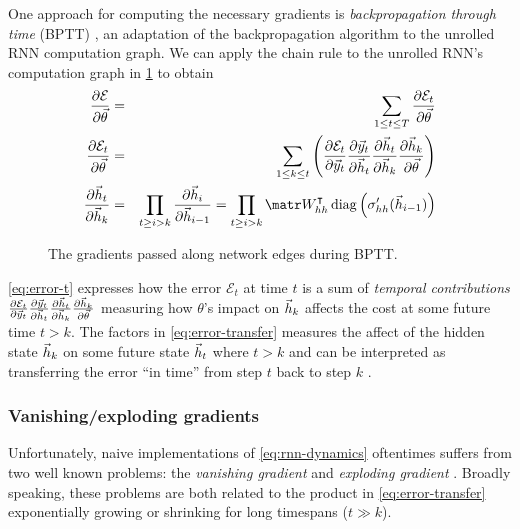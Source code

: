 One approach for computing the necessary gradients is \emph{backpropagation
through time} (BPTT) \citep{goller1996learning}, an adaptation of the backpropagation
algorithm \citep{linnainmaa1970representation,rumelhart1988learning} to the unrolled RNN computation
graph. We can apply the chain rule to the unrolled RNN's computation graph in
\cref{fig:rnn-bptt} to obtain
\begin{align}
    \frac{\pd \mathcal{E}}{\pd \vec{\theta}} &=& \sum_{1 \leq t \leq T} \frac{\pd \mathcal{E}_t}{\pd \vec{\theta}} \\
    \frac{\pd \mathcal{E}_t}{\pd \vec{\theta}} &=& \sum_{1 \leq k \leq t} \left(
        \frac{\pd \mathcal{E}_t}{\pd \y_t}
        \frac{\pd \y_t}{\pd \h_t}
        \frac{\pd \h_t}{\pd \h_k}
        \frac{\pd \h_k}{\pd \vec{\theta}}
    \right) \label{eq:error-t}\\
    \frac{\pd \h_t}{\pd \h_k} &=&
    \prod_{t \geq i > k} \frac{\pd \h_i}{\pd \h_{i-1}}
    = \prod_{t \geq i > k} \W_{hh}^\tp \diag \left( \sigma_{hh}'( \h_{i-1} ) \right)
    \label{eq:error-transfer}
\end{align}

\begin{figure}[htpb]
    \centering
    
    \caption{The gradients passed along network edges during BPTT.}
    \label{fig:rnn-bptt}
\end{figure}

\cref{eq:error-t} expresses how the error $\mathcal{E}_t$ at time $t$ is a sum
of \emph{temporal contributions} $
\frac{\partial \mathcal{E}_t}{\partial \vec{y}_t}
\frac{\partial \vec{y}_t}{\partial \vec{h}_t}
\frac{\partial \vec{h}_t}{\partial \vec{h}_k}
\frac{\partial \vec{h}_k}{\partial \vec{\theta}}$
measuring how $\theta$'s impact on $\vec{h}_k$ affects the cost at some future
time $t > k$. The factors in \cref{eq:error-transfer} measures the affect
of the hidden state $\vec{h}_k$ on some future state $\vec{h}_t$ where $t > k$
and can be interpreted as transferring the error ``in time'' from step $t$ back
to step $k$ \citep{Pascanu2012}.

\subsubsection{Vanishing/exploding gradients}

Unfortunately, naive implementations of \cref{eq:rnn-dynamics} oftentimes suffers from two well known problems: the
\emph{vanishing gradient} and \emph{exploding gradient} \citep{Bengio1994}.
Broadly speaking, these problems are both related to the product in
\cref{eq:error-transfer} exponentially growing or shrinking for long
timespans (\ie $t \gg k$).

